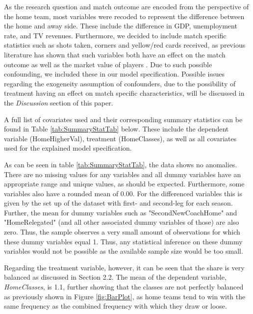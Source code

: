 \documentclass[11pt]{article}
\begin{document}
As the research question and match outcome are encoded from the perspective of the home team, most variables were recoded to represent the difference between the home and away side. These include the difference in GDP, unemployment rate, and TV revenues. Furthermore, we decided to include match specific statistics such as shots taken, corners and yellow/red cards received, as previous literature has shown that such variables both have an effect on the match outcome as well as the market value of players \cite[p. 614]{muller2017}. Due to such possible confounding, we included these in our model specification. Possible issues regarding the exogeneity assumption of confounders, due to the possibility of treatment having an effect on match specific characteristics, will be discussed in the \textit{Discussion} section of this paper.

A full list of covariates used and their corresponding summary statistics can be found in Table \ref{tab:SummaryStatTab} below. These include the dependent variable (HomeHigherVal), treatment (HomeClasses), as well as all  covariates used for the explained model specification.

As can be seen in table \ref{tab:SummaryStatTab}, the data shows no anomalies. There are no missing values for any variables and all dummy variables have an appropriate range and unique values, as should be expected. Furthermore, some variables also have a rounded mean of 0.00. For the differenced variables this is given by the set up of the dataset with first- and second-leg for each season. Further, the mean for dummy variables such as "SecondNewCoachHome" and "HomeRelegated" (and all other associated dummy variables of those) are also zero. Thus, the sample observes a very small amount of observations for which these dummy variables equal 1. Thus, any statistical inference on these dummy variables would not be possible as the available sample size would be too small.

Regarding the treatment variable, however, it can be seen that the share is very balanced as discussed in Section 2.2. The mean of the dependent variable, \textit{HomeClasses}, is 1.1, further showing that the classes are not perfectly balanced as previously shown in Figure \ref{fig:BarPlot}, as home teams tend to win with the same frequency as the combined frequency with which they draw or loose.
\end{document}
